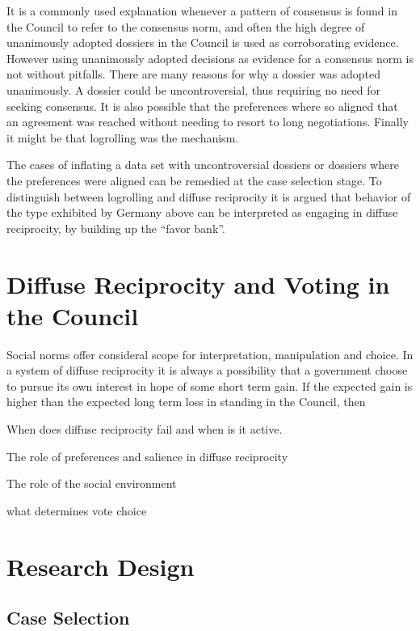 It is a commonly used explanation whenever a pattern of consensus is found in the Council to refer to the consensus norm, and often the high degree of unanimously adopted dossiers in the Council is used as corroborating evidence. However using unanimously adopted decisions as evidence for a consensus norm is not without pitfalls. There are many reasons for why a dossier was adopted unanimously. A dossier could be uncontroversial, thus requiring no need for seeking consensus. It is also possible that the preferences where so aligned that an agreement was reached without needing to resort to long negotiations. Finally it might be that logrolling was the mechanism. 

The cases of inflating a data set with uncontroversial dossiers or dossiers where the preferences were aligned can be remedied at the case selection stage. To distinguish between logrolling and diffuse reciprocity it is argued that behavior of the type exhibited by Germany above can be interpreted as engaging in diffuse reciprocity, by building up the ``favor bank''. 


\section{Diffuse Reciprocity and Voting in the Council}

Social norms offer consideral scope for interpretation, manipulation and choice. In a system of diffuse reciprocity it is always a possibility that a government choose to pursue its own interest in hope of some short term gain. If the expected gain is higher than the expected long term loss in standing in the Council, then 

When does diffuse reciprocity fail and when is it active.

The role of preferences and salience in diffuse reciprocity

The role of the social environment

what determines vote choice


\section{Research Design}

\subsection{Case Selection}

